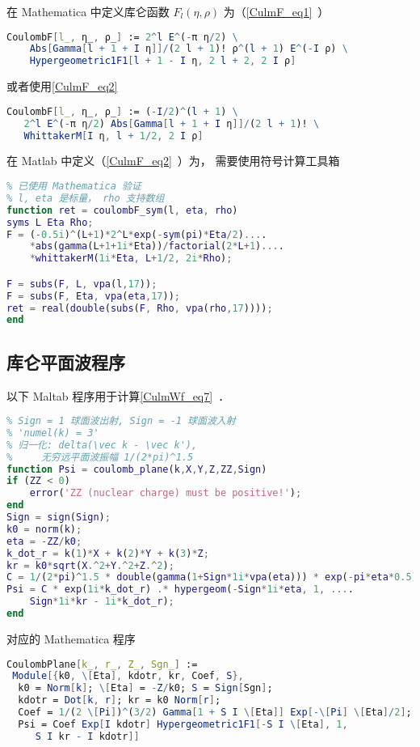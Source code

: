 


在 Mathematica 中定义库仑函数 $F_l(\eta, \rho)$ 为（\autoref{CulmF_eq1}~） %
\begin{lstlisting}[language=Mathematica]
CoulombF[l_, η_, ρ_] := 2^l E^(-π η/2) \
    Abs[Gamma[l + 1 + I η]]/(2 l + 1)! ρ^(l + 1) E^(-I ρ) \
    Hypergeometric1F1[l + 1 - I η, 2 l + 2, 2 I ρ]
\end{lstlisting}
或者使用\autoref{CulmF_eq2}~\upref{CulmF} %
\begin{lstlisting}[language=Mathematica]
CoulombF[l_, η_, ρ_] := (-I/2)^(l + 1) \
   2^l E^(-π η/2) Abs[Gamma[l + 1 + I η]]/(2 l + 1)! \
   WhittakerM[I η, l + 1/2, 2 I ρ]
\end{lstlisting}

在 Matlab 中定义（\autoref{CulmF_eq2}~\upref{CulmF}）为， 需要使用符号计算工具箱 %
\begin{lstlisting}[language=matlab, caption=coulombF\_sym.m]
% 第一类库仑函数 F_l(eta, rho)
% 已使用 Mathematica 验证
% l, eta 是标量， rho 支持数组
function ret = coulombF_sym(l, eta, rho)
syms L Eta Rho;
F = (-0.5i)^(L+1)*2^L*exp(-sym(pi)*Eta/2)....
    *abs(gamma(L+1+1i*Eta))/factorial(2*L+1)....
    *whittakerM(1i*Eta, L+1/2, 2i*Rho);

F = subs(F, L, vpa(l,17));
F = subs(F, Eta, vpa(eta,17));
ret = real(double(subs(F, Rho, vpa(rho,17))));
end
\end{lstlisting}

\subsection{库仑平面波程序}
以下 Maltab 程序用于计算\autoref{CulmWf_eq7}~．
\begin{lstlisting}[language=matlab, caption=coulomb\_plane.m]
% 直角坐标系的库仑平面波
% Sign = 1 球面波出射, Sign = -1 球面波入射
% 'numel(k) = 3'
% 归一化: delta(\vec k - \vec k'),
%     无穷远平面波振幅 1/(2*pi)^1.5
function Psi = coulomb_plane(k,X,Y,Z,ZZ,Sign)
if (ZZ < 0)
    error('ZZ (nuclear charge) must be positive!');
end
Sign = sign(Sign);
k0 = norm(k);
eta = -ZZ/k0;
k_dot_r = k(1)*X + k(2)*Y + k(3)*Z;
kr = k0*sqrt(X.^2+Y.^2+Z.^2);
C = 1/(2*pi)^1.5 * double(gamma(1+Sign*1i*vpa(eta))) * exp(-pi*eta*0.5);
Psi = C * exp(1i*k_dot_r) .* hypergeom(-Sign*1i*eta, 1, ....
    Sign*1i*kr - 1i*k_dot_r);
end
\end{lstlisting}

对应的 Mathematica 程序
\begin{lstlisting}[language=Mathematica]
CoulombPlane[k_, r_, Z_, Sgn_] := 
 Module[{k0, \[Eta], kdotr, kr, Coef, S},
  k0 = Norm[k]; \[Eta] = -Z/k0; S = Sign[Sgn];
  kdotr = Dot[k, r]; kr = k0 Norm[r];
  Coef = 1/(2 \[Pi])^(3/2) Gamma[1 + S I \[Eta]] Exp[-\[Pi] \[Eta]/2];
  Psi = Coef Exp[I kdotr] Hypergeometric1F1[-S I \[Eta], 1, 
     S I kr - I kdotr]]
\end{lstlisting}
